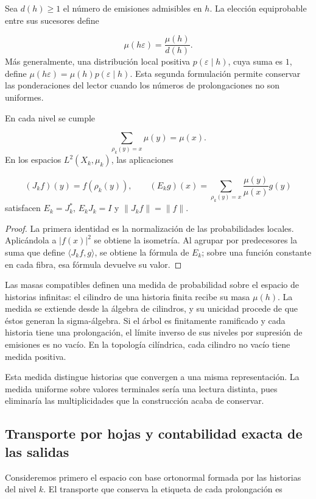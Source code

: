Sea \(d(h)\geq1\) el número de emisiones admisibles en \(h\). La elección equiprobable entre sus sucesores define

\[
\mu(h\varepsilon)=\frac{\mu(h)}{d(h)}.
\]
Más generalmente, una distribución local positiva \(p(\varepsilon\mid h)\), cuya suma es \(1\), define \(\mu(h\varepsilon)=\mu(h)p(\varepsilon\mid h)\). Esta segunda formulación permite conservar las ponderaciones del lector cuando los números de prolongaciones no son uniformes.

\begin{proposition}
\label{iv:cont:esperanza}
En cada nivel se cumple

\[
\sum_{\rho_k(y)=x}\mu(y)=\mu(x).
\]
En los espacios \(L^2(X_k,\mu_k)\), las aplicaciones

\[
(J_kf)(y)=f(\rho_k(y)),
\qquad
(E_kg)(x)=\sum_{\rho_k(y)=x}\frac{\mu(y)}{\mu(x)}g(y)
\]
satisfacen \(E_k=J_k^*\), \(E_kJ_k=I\) y \(\|J_kf\|=\|f\|\).

\end{proposition}
\begin{proof}
La primera identidad es la normalización de las probabilidades locales. Aplicándola a \(|f(x)|^2\) se obtiene la isometría. Al agrupar por predecesores la suma que define \(\langle J_kf,g\rangle\), se obtiene la fórmula de \(E_k\); sobre una función constante en cada fibra, esa fórmula devuelve su valor.
\end{proof}

Las masas compatibles definen una medida de probabilidad sobre el espacio de historias infinitas: el cilindro de una historia finita recibe su masa \(\mu(h)\). La medida se extiende desde la álgebra de cilindros, y su unicidad procede de que éstos generan la sigma-álgebra. Si el árbol es finitamente ramificado y cada historia tiene una prolongación, el límite inverso de sus niveles por supresión de emisiones es no vacío. En la topología cilíndrica, cada cilindro no vacío tiene medida positiva.

Esta medida distingue historias que convergen a una misma representación. La medida uniforme sobre valores terminales sería una lectura distinta, pues eliminaría las multiplicidades que la construcción acaba de conservar.

\subsection{Transporte por hojas y contabilidad exacta de las salidas}
\label{iv:cont:transporte}
Consideremos primero el espacio con base ortonormal formada por las historias del nivel \(k\). El transporte que conserva la etiqueta de cada prolongación es


